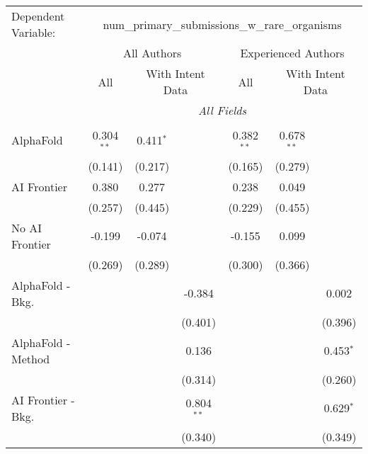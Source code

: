 \begingroup
\centering
\begin{tabular}{lcccccc}
   \tabularnewline \midrule \midrule
   Dependent Variable: & \multicolumn{6}{c}{num\_primary\_submissions\_w\_rare\_organisms}\\
 & \multicolumn{3}{c}{All Authors} & \multicolumn{3}{c}{Experienced Authors} \\
\cmidrule(lr){2-4} \cmidrule(lr){5-7}
 & \multicolumn{1}{c}{All} & \multicolumn{2}{c}{With Intent Data} & \multicolumn{1}{c}{All} & \multicolumn{2}{c}{With Intent Data} \\
\cmidrule(lr){2-2} \cmidrule(lr){3-4} \cmidrule(lr){5-5} \cmidrule(lr){6-7}
 & \multicolumn{6}{c}{\textit{All Fields}} \\ \\
   AlphaFold               & 0.304$^{**}$ & 0.411$^{*}$ &              & 0.382$^{**}$ & 0.678$^{**}$ &   \\   
                           & (0.141)      & (0.217)     &              & (0.165)      & (0.279)      &   \\   
   AI Frontier             & 0.380        & 0.277       &              & 0.238        & 0.049        &   \\   
                           & (0.257)      & (0.445)     &              & (0.229)      & (0.455)      &   \\   
   No AI Frontier          & -0.199       & -0.074      &              & -0.155       & 0.099        &   \\   
                           & (0.269)      & (0.289)     &              & (0.300)      & (0.366)      &   \\   
   AlphaFold - Bkg.        &              &             & -0.384       &              &              & 0.002\\   
                           &              &             & (0.401)      &              &              & (0.396)\\   
   AlphaFold - Method      &              &             & 0.136        &              &              & 0.453$^{*}$\\   
                           &              &             & (0.314)      &              &              & (0.260)\\   
   AI Frontier - Bkg.      &              &             & 0.804$^{**}$ &              &              & 0.629$^{*}$\\   
                           &              &             & (0.340)      &              &              & (0.349)\\   

\end{tabular}
